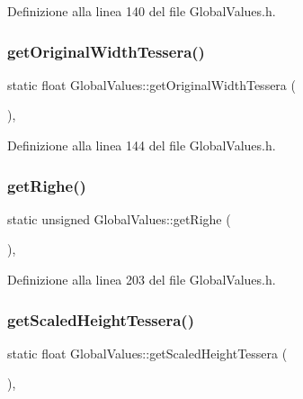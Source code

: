 Definizione alla linea 140 del file Global\+Values.\+h.

\mbox{\label{class_global_values_a242d902ba619752615765915971f5b9b}} 
\subsubsection{\texorpdfstring{get\+Original\+Width\+Tessera()}{getOriginalWidthTessera()}}
{\footnotesize\ttfamily static float Global\+Values\+::get\+Original\+Width\+Tessera (\begin{DoxyParamCaption}{ }\end{DoxyParamCaption})\hspace{0.3cm}{\ttfamily [inline]}, {\ttfamily [static]}}



Definizione alla linea 144 del file Global\+Values.\+h.

\mbox{\label{class_global_values_af7537a042a80f39285802564594be80b}} 
\subsubsection{\texorpdfstring{get\+Righe()}{getRighe()}}
{\footnotesize\ttfamily static unsigned Global\+Values\+::get\+Righe (\begin{DoxyParamCaption}{ }\end{DoxyParamCaption})\hspace{0.3cm}{\ttfamily [inline]}, {\ttfamily [static]}}



Definizione alla linea 203 del file Global\+Values.\+h.

\mbox{\label{class_global_values_a001c2405391f076998692061beb77832}} 
\subsubsection{\texorpdfstring{get\+Scaled\+Height\+Tessera()}{getScaledHeightTessera()}}
{\footnotesize\ttfamily static float Global\+Values\+::get\+Scaled\+Height\+Tessera (\begin{DoxyParamCaption}{ }\end{DoxyParamCaption})\hspace{0.3cm}{\ttfamily [inline]}, {\ttfamily [static]}}



